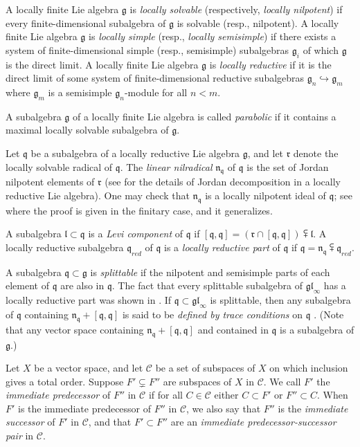 \documentclass{amsart}
\theoremstyle{definition}
\theoremstyle{remark}
\numberwithin{equation}{section}
\def\gl{\mathfrak {gl}}
\def\g{\mathfrak {g}}
\def\l{\mathfrak {l}}
\def\n{\mathfrak {n}}
\def\q{\mathfrak{q}}
\def\r{\mathfrak{r}}
\def\Ch{\mathcal{C}}
\begin{document}
A locally finite Lie algebra $\g$ is \emph{locally solvable} (respectively, \emph{locally nilpotent}) if every finite-dimensional subalgebra of $\g$ is solvable (resp., nilpotent).  A locally finite Lie algebra $\g$ is \emph{locally simple} (resp., \emph{locally semisimple}) if there exists a system of finite-dimensional simple (resp., semisimple) subalgebras $\g_i$ of which $\g$ is the direct limit.  A locally finite Lie algebra $\g$ is \emph{locally reductive} if it is the direct limit of some system of finite-dimensional reductive subalgebras $\g_n \hookrightarrow \g_m$ where $\g_m$ is a semisimple $\g_n$-module for all $n < m$. 

A subalgebra $\g$ of a locally finite Lie algebra is called \emph{parabolic} if it contains a maximal locally solvable subalgebra of $\g$.

Let $\q$ be a subalgebra of a locally reductive Lie algebra $\g$, and let $\r$ denote the locally solvable radical of $\q$.  The \emph{linear nilradical} $\n_\q$ of $\q$ is the set of Jordan nilpotent elements of $\r$ (see \cite{DPSnyder} for the details of Jordan decomposition in a locally reductive Lie algebra).  One may check that $\n_\q$ is a locally nilpotent ideal of $\q$; see \cite{DP} where the proof is given in the finitary case, and it generalizes.  

A subalgebra $\l \subset \q$ is a \emph{Levi component} of $\q$ if $[\q,\q] = (\r \cap [\q,\q]) \subsetplus \l$.  A locally reductive subalgebra $\q_{red}$ of $\q$ is a \emph{locally reductive part} of $\q$ if $\q = \n_\q \subsetplus \q_{red}$.

A subalgebra $\q \subset \g$ is \emph{splittable} if the nilpotent and semisimple parts of each element of $\q$ are also in $\q$.  The fact that every splittable subalgebra of $\gl_\infty$ has a locally reductive part was shown in \cite{DP}.  If $\q \subset \gl_\infty$ is splittable, then any subalgebra of $\q$ containing $\n_\q + [\q,\q]$ is said to be \emph{defined by trace conditions} on $\q$ \cite{DP}.  (Note that any vector space containing $\n_\q + [\q,\q]$ and contained in $\q$ is a subalgebra of $\g$.)

Let $X$ be a vector space, and let $\Ch$ be a set of subspaces of $X$ on which inclusion gives a total order.  Suppose $F' \subsetneq F''$ are subspaces of $X$ in $\Ch$.  We call $F'$ the \emph{immediate predecessor} of $F''$ in $\Ch$ if for all $C \in \Ch$ either $C \subset F'$ or $F'' \subset C$.  When $F'$ is the immediate predecessor of $F''$ in $\Ch$, we also say that $F''$ is the \emph{immediate successor} of $F'$ in $\Ch$, and that $F' \subset F''$ are an \emph{immediate predecessor-successor pair} in $\Ch$.  
\end{document}
